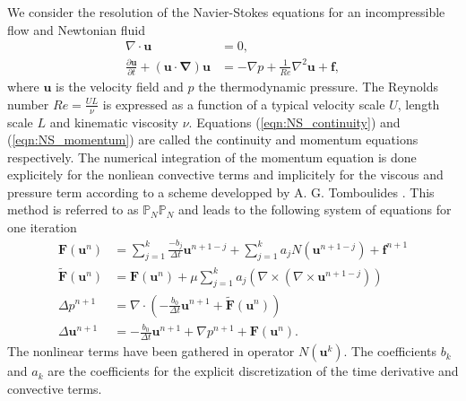 \documentclass{sig-alternate}
\begin{document}
We consider the resolution of the Navier-Stokes equations for an incompressible flow and Newtonian fluid
\begin{align}
 \nabla \cdot \mathbf{u} & = 0, \label{eqn:NS_continuity}\\
 \frac{\partial \mathbf{u}}{\partial t} + (\mathbf{u \cdot \nabla}) \mathbf{u} & = - \nabla p + \frac{1}{Re} \nabla^2 \mathbf{u} + \mathbf{f} \label{eqn:NS_momentum},
\end{align}
where $\mathbf{u}$ is the velocity field and $p$ the thermodynamic pressure. The Reynolds number $Re = \frac{U L}{\nu}$ is expressed as a function of a typical velocity scale $U$, length scale $L$ and kinematic viscosity $\nu$. Equations (\ref{eqn:NS_continuity}) and (\ref{eqn:NS_momentum}) are called the continuity and momentum equations respectively. The numerical integration of the momentum equation is done explicitely for the nonliean convective terms and implicitely for the viscous and pressure term according to a scheme developped by A. G. Tomboulides \cite{Tomboulides1997}. This method is referred to as $\mathbb{P}_N\mathbb{P}_N$ and leads to the following system of equations for one iteration
\begin {align}
 \mathbf{F} \left( \mathbf{u}^{n} \right) & = \sum_{j=1}^{k} \frac{-b_j}{\Delta t} \mathbf{u}^{n+1-j} + \sum_{j=1}^{k} a_j N \left( \mathbf{u}^{n+1-j} \right) +  \mathbf{f}^{n+1} \label{eqn:rhs1}\\
 \mathbf{\tilde{F}} \left( \mathbf{u}^{n} \right) & = \mathbf{F}\left(\mathbf{u}^{n}\right) + \mu \sum_{j=1}^{k} a_j \left( \nabla \times \left( \nabla \times \mathbf{u}^{n+1-j} \right) \right) \label{eqn:rhs2} \\
 \Delta p^{n+1} & = \nabla \cdot \left( -\frac{b_0}{\Delta t} \mathbf{u}^{n+1} + \mathbf{\tilde{F}} \left( \mathbf{u}^{n} \right) \right) \label{eqn:hmhz_pres}\\
 \Delta \mathbf{u}^{n+1} & = - \frac{b_0}{\Delta t} \mathbf{u}^{n+1} + \nabla p^{n+1} + \mathbf{F} \left( \mathbf{u}^{n} \right). \label{eqn:hmhz_vel}
\end {align}
The nonlinear terms have been gathered in operator $N \left( \mathbf{u}^{k} \right)$. The coefficients $b_k$ and $a_k$ are the coefficients for the explicit discretization of the time derivative and convective terms.
\end{document}
